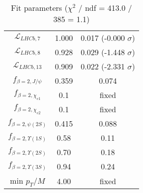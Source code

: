 \begin{table}[h!]
\begin{tabular}{c|c|c}
$\mathcal L_{LHCb,7}$ & 1.000 & 0.017 (-0.000 $\sigma$) \\
$\mathcal L_{LHCb,8}$ & 0.928 & 0.029 (-1.448 $\sigma$) \\
$\mathcal L_{LHCb,13}$ & 0.909 & 0.022 (-2.331 $\sigma$) \\
$f_{\beta=2,J/\psi}$ & 0.359 & 0.074 \\
$f_{\beta=2,\chi_{c1}}$ & 0.1 & fixed \\
$f_{\beta=2,\chi_{c2}}$ & 0.1 & fixed \\
$f_{\beta=2,\psi(2S)}$ & 0.415 & 0.088 \\
$f_{\beta=2,\Upsilon(1S)}$ & 0.58 & 0.11 \\
$f_{\beta=2,\Upsilon(2S)}$ & 0.70 & 0.18 \\
$f_{\beta=2,\Upsilon(3S)}$ & 0.94 & 0.24 \\
min $p_T/M$ & 4.00 & fixed \\
\end{tabular}
\caption{Fit parameters ($\chi^2$ / ndf = 413.0 / 385 = 1.1)}
\end{table}
